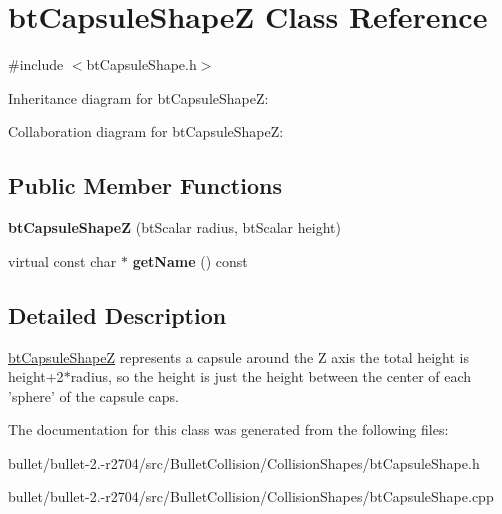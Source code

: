 \hypertarget{classbt_capsule_shape_z}{\section{bt\+Capsule\+Shape\+Z Class Reference}
\label{classbt_capsule_shape_z}
}


{\ttfamily \#include $<$bt\+Capsule\+Shape.\+h$>$}



Inheritance diagram for bt\+Capsule\+Shape\+Z\+:


Collaboration diagram for bt\+Capsule\+Shape\+Z\+:
\subsection*{Public Member Functions}
\begin{DoxyCompactItemize}
\item 
\hypertarget{classbt_capsule_shape_z_acb79a1941530fc938a80ddda03373fcd}{{\bfseries bt\+Capsule\+Shape\+Z} (bt\+Scalar radius, bt\+Scalar height)}\label{classbt_capsule_shape_z_acb79a1941530fc938a80ddda03373fcd}

\item 
\hypertarget{classbt_capsule_shape_z_a6c1568243dae35da8182c18a92bec18a}{virtual const char $\ast$ {\bfseries get\+Name} () const }\label{classbt_capsule_shape_z_a6c1568243dae35da8182c18a92bec18a}

\end{DoxyCompactItemize}


\subsection{Detailed Description}
\hyperlink{classbt_capsule_shape_z}{bt\+Capsule\+Shape\+Z} represents a capsule around the Z axis the total height is height+2$\ast$radius, so the height is just the height between the center of each 'sphere' of the capsule caps. 

The documentation for this class was generated from the following files\+:\begin{DoxyCompactItemize}
\item 
bullet/bullet-\/2.-\/r2704/src/\+Bullet\+Collision/\+Collision\+Shapes/bt\+Capsule\+Shape.\+h\item 
bullet/bullet-\/2.-\/r2704/src/\+Bullet\+Collision/\+Collision\+Shapes/bt\+Capsule\+Shape.\+cpp\end{DoxyCompactItemize}
